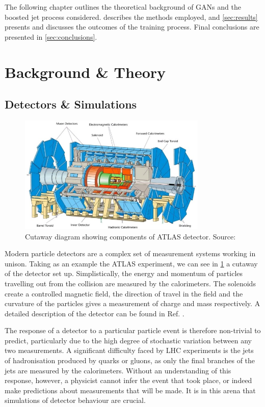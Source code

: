 \documentclass[twocolumn]{article}
\begin{document}
The following chapter outlines the theoretical background of GANs and the boosted jet process considered.  describes the methods employed, and \cref{sec:results} presents and discusses the outcomes of the training process. Final conclusions are presented in \cref{sec:conclusions}.

\section{Background \& Theory}
\label{sec:theory}


\subsection{Detectors \& Simulations}
\label{sec:detector}

\begin{figure}[!htbp]
	\centering
	\includegraphics[width=0.8\textwidth]{atlasdetector}
	
	\caption{Cutaway diagram showing components of ATLAS detector. Source: \cite{atlaspic}}
	\label{fig:atlaspic}
	
\end{figure}


Modern particle detectors are a complex set of measurement systems working in unison. Taking as an example the ATLAS experiment, we can see in \cref{fig:atlaspic} a cutaway of the detector set up. Simplistically, the energy and momentum of particles travelling out from the collision are measured by the calorimeters. The solenoids create a controlled magnetic field, the direction of travel in the field and the curvature of the particles gives a measurement of charge and mass respectively. A detailed description of the detector can be found in Ref. \cite{armstrong}.

The response of a detector to a particular particle event is therefore non-trivial to predict, particularly due to the high degree of stochastic variation between any two measurements. A significant difficulty faced by LHC experiments is the jets of hadronisation produced by quarks or gluons, as only the final branches of the jets are measured by the calorimeters. Without an understanding of this response, however, a physicist cannot infer the event that took place, or indeed make predictions about measurements that will be made. It is in this arena that simulations of detector behaviour are crucial. 
\end{document}

